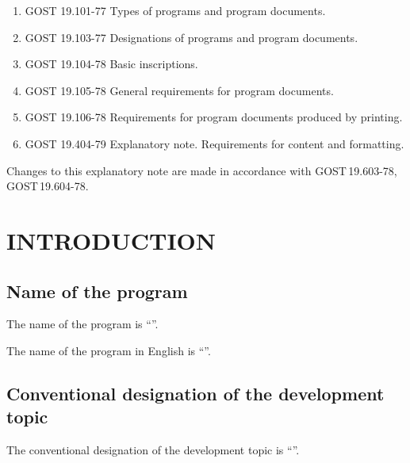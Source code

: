 \documentclass[12pt,a4paper]{extarticle}
\begin{document}
\begin{enumerate}[label=\arabic*), leftmargin=1.25cm]
\item GOST 19.101-77 Types of programs and program documents\cite{gost19101}.
\item GOST 19.103-77 Designations of programs and program documents\cite{gost19103}.
\item GOST 19.104-78 Basic inscriptions\cite{gost19104}.
\item GOST 19.105-78 General requirements for program documents\cite{gost19105}.
\item GOST 19.106-78 Requirements for program documents produced by printing\cite{gost19106}.
\item GOST 19.404-79 Explanatory note. Requirements for content and formatting\cite{gost19404}.
\end{enumerate}

Changes to this explanatory note are made in accordance with GOST\,19.603-78\cite{gost19603}, GOST\,19.604-78\cite{gost19604}.

\clearpage

\hypersetup{linkcolor=black}
\tableofcontents
\hypersetup{linkcolor=blue}
\thispagestyle{fancy}
\clearpage

\section{INTRODUCTION}

\subsection{Name of the program}

The name of the program is \enquote{\projectname}.

The name of the program in English is \enquote{\hseProjectNameEn}.

\subsection{Conventional designation of the development topic}

The conventional designation of the development topic is \enquote{\hseProjectNameShort}.
\end{document}
